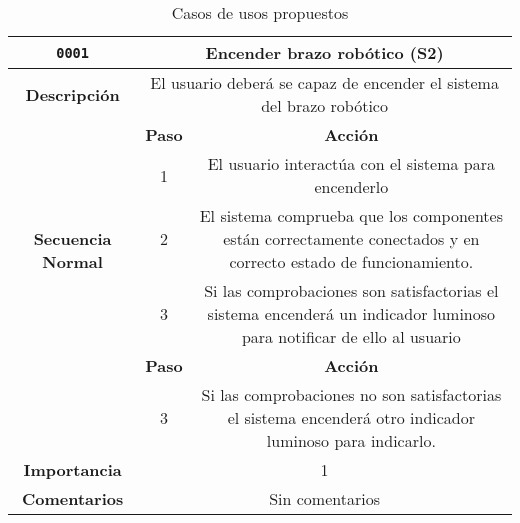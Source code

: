 \begin{table}[H]
    \centering
    \begin{tabular}{|c|c|c|}
        \hline
        \texttt{0001}                   & \multicolumn{2}{c|}{Encender brazo robótico (S2)}
        \\ \hline
        \textbf{Descripción}            & \multicolumn{2}{m{13cm}|}{El usuario
        deberá se capaz de encender el sistema del brazo robótico} 
        \\ \hline
        \multirow{5}{*}{\textbf{Secuencia Normal}} & \textbf{Paso} & \textbf{Acción}              
        \\ \cline{2-3}                    &   1  & El usuario interactúa con el sistema para encenderlo
        \\ \cline{2-3}                    &   2  & El sistema comprueba que los componentes están correctamente conectados y en correcto estado de funcionamiento.                              
        \\ \cline{2-3}                    &   3  &  Si las comprobaciones son satisfactorias el sistema encenderá un indicador luminoso para notificar de ello al usuario
        \\ \hline
        \multirow{2}{*}{\textbf{Excepciones}}     & \textbf{Paso} &\textbf{Acción} 
        \\ \cline{2-3}                    &    3  & Si las comprobaciones no son satisfactorias el sistema encenderá otro indicador luminoso para indicarlo.
        \\ \hline
        \textbf{Importancia} & \multicolumn{2}{c|}{1}
        \\ \hline
        \textbf{Comentarios} & \multicolumn{2}{c|}{Sin comentarios}
        \\ \hline
    \end{tabular}
    \label{tab:use_cases}
    \caption{Casos de usos propuestos}
\end{table}

